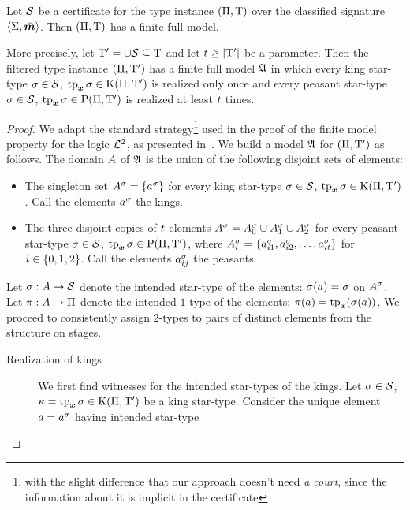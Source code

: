 \begin{lemma}\label{lem:cert-expand}
Let $\mathcal{S}$ be a certificate for the type instance $(\Pi,\mathrm{T})$ over the
classified signature $\left\langle \mathrm{\Sigma},\bar{\bm{m}} \right\rangle$.
Then $(\Pi,\mathrm{T})$ has a finite full model.

More precisely, let ${\mathrm{T}'} = \cup\mathcal{S} \subseteq \mathrm{T}$
and let $t \geq \left|{\mathrm{T}'}\right|$ be a parameter.
Then the filtered type instance $(\Pi,{\mathrm{T}'})$ has a finite full model
$\mathfrak{A}$ in which every king star-type $\sigma\in\mathcal{S}$, $\operatorname{tp}_{\bm{x}}\sigma \in
\mathrm{K}(\Pi,{\mathrm{T}'})$ is realized only once and every peasant star-type
$\sigma\in\mathcal{S}$, $\operatorname{tp}_{\bm{x}}\sigma \in \mathrm{P}(\Pi,{\mathrm{T}'})$ is realized at least $t$
times.
\end{lemma}
\begin{proof}
We adapt the standard strategy\footnote{with the slight difference that our
approach doesn't need \emph{a court}, since the information about it is implicit
in the certificate} used in the proof of the finite model property for the logic
$\mathcal{L}^{2}$, as presented in~\cite{gradel1999logics}.
We build a model $\mathfrak{A}$ for $(\Pi,{\mathrm{T}'})$ as follows.
The domain $A$ of $\mathfrak{A}$ is the union of the following disjoint sets of
elements:
\begin{itemize}
  \item The singleton set $A^{\sigma} = \left\{a^{\sigma}\right\}$ for every king
  star-type $\sigma\in\mathcal{S}$, $\operatorname{tp}_{\bm{x}}\sigma \in \mathrm{K}(\Pi,{\mathrm{T}'})$.
  Call the elements $a^{\sigma}$ the kings.
  \item The three disjoint copies of $t$ elements
  $A^{\sigma} = A^{\sigma}_{0} \cup A^{\sigma}_{1} \cup A^{\sigma}_{2}$ for every
  peasant star-type $\sigma \in \mathcal{S}$, $\operatorname{tp}_{\bm{x}}\sigma \in \mathrm{P}(\Pi,{\mathrm{T}'})$, where
  $A^{\sigma}_{i} = \left\{a^{\sigma}_{i 1}, a^{\sigma}_{i 2}, \dots, a^{\sigma}_{i t}\right\}$
  for $i \in \left\{0,1,2\right\}$.
  Call the elements $a^{\sigma}_{i j}$ the peasants.
\end{itemize}
Let $\sigma : A \to \mathcal{S}$ denote the intended star-type of the elements:
$\sigma(a) = \sigma$ on $A^{\sigma}$.
Let $\pi : A \to \Pi$ denote the intended $1$-type of the elements:
$\pi(a) = \operatorname{tp}_{\bm{x}}(\sigma(a))$.
We proceed to consistently assign $2$-types to pairs of distinct elements from
the structure on stages.
\begin{description}
  \item[Realization of kings] We first find witnesses for the intended
  star-types of the kings.
  Let $\sigma \in \mathcal{S}$, $\kappa = \operatorname{tp}_{\bm{x}}\sigma \in \mathrm{K}(\Pi,{\mathrm{T}'})$
  be a king star-type.
  Consider the unique element $a = a^\sigma$ having intended star-type

\end{description}
\end{proof}
